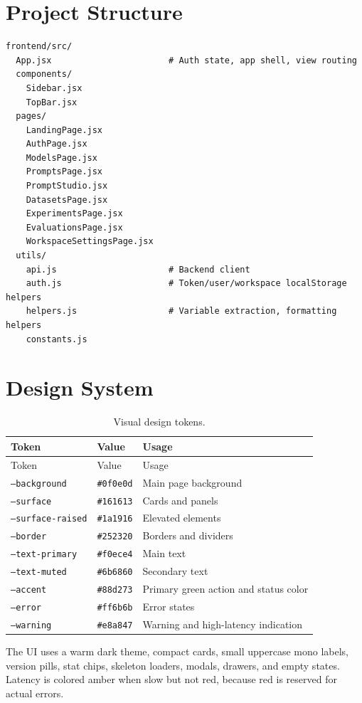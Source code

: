 \documentclass[12pt,a4paper]{report}
\begin{document}
\section{Project Structure}
\begin{lstlisting}
frontend/src/
  App.jsx                       # Auth state, app shell, view routing
  components/
    Sidebar.jsx
    TopBar.jsx
  pages/
    LandingPage.jsx
    AuthPage.jsx
    ModelsPage.jsx
    PromptsPage.jsx
    PromptStudio.jsx
    DatasetsPage.jsx
    ExperimentsPage.jsx
    EvaluationsPage.jsx
    WorkspaceSettingsPage.jsx
  utils/
    api.js                      # Backend client
    auth.js                     # Token/user/workspace localStorage helpers
    helpers.js                  # Variable extraction, formatting helpers
    constants.js
\end{lstlisting}

\section{Design System}
\begin{longtable}{p{}p{}p{}}
\caption{Visual design tokens.}\\
\toprule
Token & Value & Usage \\
\midrule
\endfirsthead
\toprule
Token & Value & Usage \\
\midrule
\endhead
\texttt{--background} & \texttt{\#0f0e0d} & Main page background \\
\texttt{--surface} & \texttt{\#161613} & Cards and panels \\
\texttt{--surface-raised} & \texttt{\#1a1916} & Elevated elements \\
\texttt{--border} & \texttt{\#252320} & Borders and dividers \\
\texttt{--text-primary} & \texttt{\#f0ece4} & Main text \\
\texttt{--text-muted} & \texttt{\#6b6860} & Secondary text \\
\texttt{--accent} & \texttt{\#88d273} & Primary green action and status color \\
\texttt{--error} & \texttt{\#ff6b6b} & Error states \\
\texttt{--warning} & \texttt{\#e8a847} & Warning and high-latency indication \\
\bottomrule
\end{longtable}

The UI uses a warm dark theme, compact cards, small uppercase mono labels, version pills, stat chips, skeleton loaders, modals, drawers, and empty states. Latency is colored amber when slow but not red, because red is reserved for actual errors.
\end{document}
